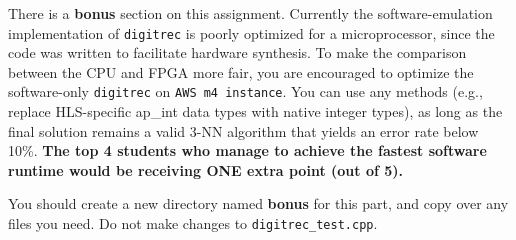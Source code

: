 \documentclass[paper=letter, fontsize=11.6pt]{scrartcl} %
\numberwithin{equation}{section} %
\numberwithin{figure}{section} %
\numberwithin{table}{section} %
\begin{document}
There is a \textbf{bonus} section on this assignment. 
Currently the software-emulation
implementation of \texttt{digitrec} is poorly optimized for a microprocessor,
since the code was written to facilitate hardware synthesis.
To make the comparison between the CPU and FPGA more fair, you are encouraged to
optimize the software-only \texttt{digitrec} on \texttt{AWS m4 instance}.
You can use any methods (e.g., replace HLS-specific ap\_int data types with native integer types), as long as the final solution remains a valid 3-NN algorithm that yields an error rate below 10\%. \textbf{The top 4 students who manage to achieve the fastest software runtime would be receiving ONE extra point (out of 5).}

You should create a new directory named \textbf{bonus} for this part, and
copy over any files you need. Do not make changes to \texttt{digitrec\_test.cpp}.
\end{document}
